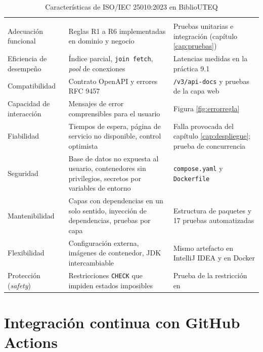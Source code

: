 \begin{xltabular}{\linewidth}{@{}L{3.4cm}YL{4.0cm}@{}}
	\caption{Características de ISO/IEC 25010:2023 en BiblioUTEQ}\label{tab:iso}\\
	\toprule
	 &  &  \\
	\midrule
	\endfirsthead
	\toprule
	 &  &  \\
	\midrule
	\endhead
	Adecuación funcional & Reglas R1 a R6 implementadas en dominio y negocio & Pruebas unitarias e integración (capítulo \ref{cap:pruebas}) \\
	\addlinespace
	Eficiencia de desempeño & Índice parcial, \texttt{join fetch}, \emph{pool} de conexiones & Latencias medidas en la práctica 9.1 \\
	\addlinespace
	Compatibilidad & Contrato OpenAPI y errores RFC 9457 & \texttt{/v3/api-docs} y pruebas de la capa web \\
	\addlinespace
	Capacidad de interacción & Mensajes de error comprensibles para el usuario & Figura \ref{fig:errorregla} \\
	\addlinespace
	Fiabilidad & Tiempos de espera, página de servicio no disponible, control optimista & Falla provocada del capítulo \ref{cap:despliegue}; prueba de concurrencia \\
	\addlinespace
	Seguridad & Base de datos no expuesta al usuario, contenedores sin privilegios, secretos por variables de entorno & \texttt{compose.yaml} y \texttt{Dockerfile} \\
	\addlinespace
	Mantenibilidad & Capas con dependencias en un solo sentido, inyección de dependencias, pruebas por capa & Estructura de paquetes y 17 pruebas automatizadas \\
	\addlinespace
	Flexibilidad & Configuración externa, imágenes de contenedor, JDK intercambiable & Mismo artefacto en IntelliJ IDEA y en Docker \\
	\addlinespace
	Protección (\emph{safety}) & Restricciones \texttt{CHECK} que impiden estados imposibles & Prueba de la restricción en  \\
	\bottomrule
\end{xltabular}

\section{Integración continua con GitHub Actions}

